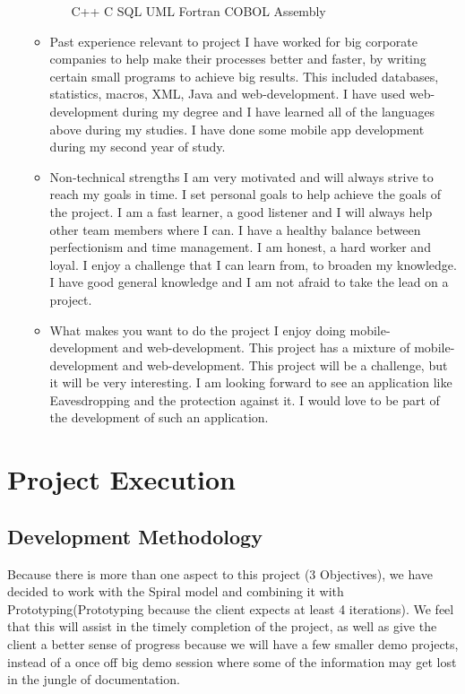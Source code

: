 \documentclass[12pt, oneside]{article}
\begin{document}
\begin{enumerate}
\begin{itemize}
\begin{itemize}
					C++\newline
					C\newline
					SQL\newline
					UML\newline	
					Fortran\newline
					COBOL\newline
					Assembly\newline
				\end{itemize}
			\item Past experience relevant to project\newline
				I have worked for big corporate companies to help make their processes better and faster, by writing 						certain small programs to achieve big results. This included databases, statistics, macros, XML, Java and 						web-development. I have used web-development during my degree and I have learned all of the 							languages above during my studies. I have done some mobile app development during my second year of study.
			\item Non-technical strengths\newline
				I am very motivated and will always strive to reach my goals in time. I set personal goals to help achieve 						the goals of the project. I am a fast learner, a good listener and I will always help other team members 						where I can. I have a healthy balance between perfectionism and time management. I am honest, a hard 						worker and loyal. I enjoy a challenge that I can learn from, to broaden my knowledge. I have good 							general knowledge and I am not afraid to take the lead on a project.
			\item What makes you want to do the project\newline
				I enjoy doing mobile-development and web-development. This project has a mixture of mobile-							development and web-development. This project will be a challenge, but it will be very interesting. I am 						looking forward to see an application like Eavesdropping and the protection against it. I would love to be 						part of the development of such an application.
		\end{itemize}
	\end{enumerate}
	
\section{Project Execution}
	\subsection{Development Methodology}
		Because there is more than one aspect to this project (3 Objectives), we have decided to work with the Spiral
		model and combining it with Prototyping(Prototyping because the client expects at least 4 iterations).
		We feel that this will assist in the timely completion of the project, as well as give the client a better sense of 
		progress because we will have a few smaller demo projects, instead of a once off big demo session where some of the information may get lost in the jungle of documentation.
		
\end{document}
